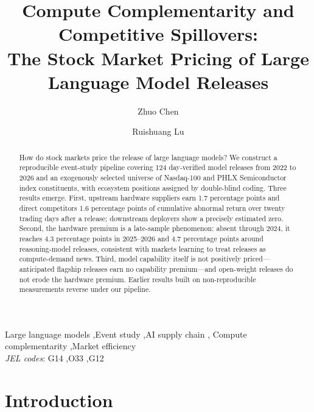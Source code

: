 \documentclass[review,12pt,authoryear]{elsarticle}
\begin{document}
\begin{frontmatter}

\title{Compute Complementarity and Competitive Spillovers:\\
The Stock Market Pricing of Large Language Model Releases}

\author[sdu]{Zhuo Chen}
\author[sdu]{Ruishuang Lu}

\begin{abstract}
How do stock markets price the release of large language models? We construct a
reproducible event-study pipeline covering 124 day-verified model releases from
2022 to 2026 and an exogenously selected universe of Nasdaq-100 and PHLX
Semiconductor index constituents, with ecosystem positions assigned by
double-blind coding. Three results emerge. First, upstream hardware suppliers
earn 1.7 percentage points and direct competitors 1.6 percentage points of
cumulative abnormal return over twenty trading days after a release; downstream
deployers show a precisely estimated zero. Second, the hardware premium is a
late-sample phenomenon: absent through 2024, it reaches 4.3 percentage points in
2025--2026 and 4.7 percentage points around reasoning-model releases,
consistent with markets learning to treat releases as compute-demand news.
Third, model capability itself is not positively priced---anticipated flagship
releases earn no capability premium---and open-weight releases do not erode the
hardware premium. Earlier results built on non-reproducible measurements
reverse under our pipeline.
\end{abstract}

\begin{keyword}
Large language models \sep Event study \sep AI supply chain \sep
Compute complementarity \sep Market efficiency
\\ \textit{JEL codes}: G14 \sep O33 \sep G12
\end{keyword}

\end{frontmatter}

\section{Introduction}
\end{document}
